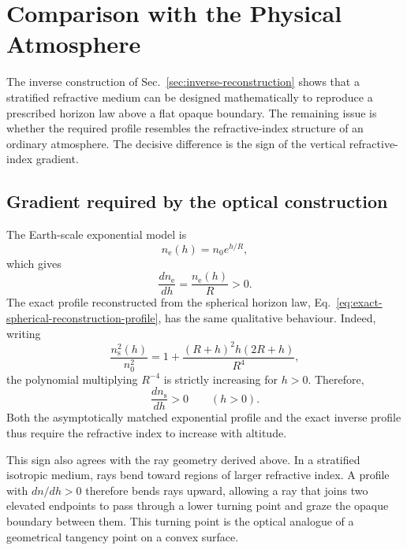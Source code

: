 \section{Comparison with the Physical Atmosphere}
\label{sec:physical-atmosphere}

The inverse construction of Sec.~\ref{sec:inverse-reconstruction} shows that a
stratified refractive medium can be designed mathematically to reproduce a
prescribed horizon law above a flat opaque boundary. The remaining issue is
whether the required profile resembles the refractive-index structure of an
ordinary atmosphere. The decisive difference is the sign of the vertical
refractive-index gradient.

\subsection{Gradient required by the optical construction}

The Earth-scale exponential model is
\begin{equation}
    n_{\mathrm{e}}(h)=n_0 e^{h/R},
    \label{eq:required-exponential-profile}
\end{equation}
which gives
\begin{equation}
    \frac{dn_{\mathrm{e}}}{dh}
    =
    \frac{n_{\mathrm{e}}(h)}{R}
    >0.
    \label{eq:required-positive-gradient}
\end{equation}
The exact profile reconstructed from the spherical horizon law,
Eq.~\eqref{eq:exact-spherical-reconstruction-profile}, has the same qualitative
behaviour. Indeed, writing
\begin{equation}
    \frac{n_{\mathrm{s}}^2(h)}{n_0^2}
    =
    1+
    \frac{(R+h)^2h(2R+h)}{R^4},
\end{equation}
the polynomial multiplying $R^{-4}$ is strictly increasing for $h>0$.
Therefore,
\begin{equation}
    \frac{dn_{\mathrm{s}}}{dh}>0
    \qquad (h>0).
    \label{eq:reconstructed-positive-gradient}
\end{equation}
Both the asymptotically matched exponential profile and the exact inverse
profile thus require the refractive index to increase with altitude.

This sign also agrees with the ray geometry derived above. In a stratified
isotropic medium, rays bend toward regions of larger refractive index. A
profile with $dn/dh>0$ therefore bends rays upward, allowing a ray that joins
two elevated endpoints to pass through a lower turning point and graze the
opaque boundary between them. This turning point is the optical analogue of a
geometrical tangency point on a convex surface.

